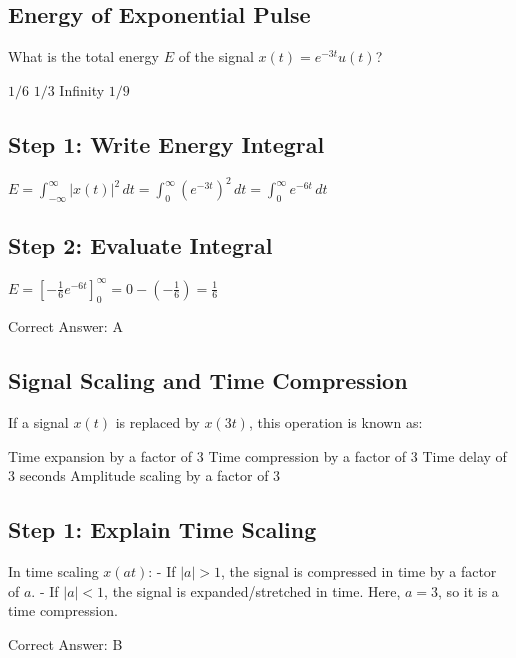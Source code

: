 \clearpage

\subsection{Energy of Exponential Pulse}

What is the total energy $E$ of the signal $x(t) = e^{-3t} u(t)$?

\begin{choices}
    \correctchoice $1/6$
    \choice $1/3$
    \choice Infinity
    \choice $1/9$
\end{choices}

\begin{solution}

\subsection*{Step 1: Write Energy Integral}
$E = \int_{-\infty}^{\infty} |x(t)|^2\, dt = \int_{0}^{\infty} (e^{-3t})^2\, dt = \int_{0}^{\infty} e^{-6t}\, dt$

\subsection*{Step 2: Evaluate Integral}
$E = \left[ -\frac{1}{6} e^{-6t} \right]_{0}^{\infty} = 0 - \left( -\frac{1}{6} \right) = \frac{1}{6}$

Correct Answer: A
\end{solution}

\clearpage

\subsection{Signal Scaling and Time Compression}

If a signal $x(t)$ is replaced by $x(3t)$, this operation is known as:

\begin{choices}
    \choice Time expansion by a factor of 3
    \correctchoice Time compression by a factor of 3
    \choice Time delay of 3 seconds
    \choice Amplitude scaling by a factor of 3
\end{choices}

\begin{solution}

\subsection*{Step 1: Explain Time Scaling}
In time scaling $x(at)$:
- If $|a| > 1$, the signal is compressed in time by a factor of $a$.
- If $|a| < 1$, the signal is expanded/stretched in time.
Here, $a = 3$, so it is a time compression.

Correct Answer: B
\end{solution}

